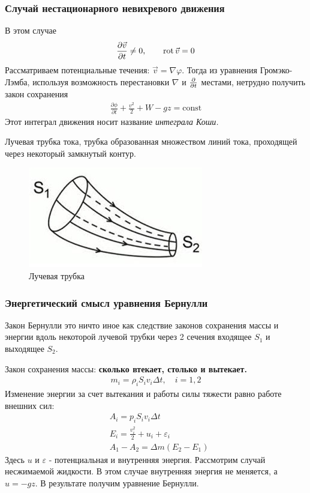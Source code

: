 \subsubsection{Случай нестационарного невихревого движения}
В этом случае
\begin{align*}
	\frac { \partial \vec{v} } { \partial t } \neq 0, \qquad
	\operatorname{rot} \vec{v} = 0
\end{align*}
Рассматриваем  потенциальные течения: $ \vec{v} = \nabla \varphi $. Тогда из уравнения Громэко-Лэмба, используя возможность перестановки $\nabla$ и $\pdv{t}$ местами, нетрудно получить закон сохранения
\begin{align*}
\frac { \partial \phi } { \partial t } + \frac { v ^ { 2 } } { 2 } + W - g z = \mathrm { const }
\end{align*}
Этот интеграл движения носит название \textit{интеграла Коши.}

Лучевая трубка тока, трубка образованная множеством линий тока, проходящей через некоторый замкнутый контур.
\begin{figure}[H]
	\centering
	\includegraphics[scale=1]{photo/trubka.jpg}
	\caption{Лучевая трубка}
	\label{fig:figure7}
\end{figure}

\subsubsection{Энергетический смысл уравнения Бернулли}

Закон Бернулли это ничто иное как следствие законов сохранения  массы и энергии вдоль некоторой лучевой трубки через 2 сечения входящее $S_1$ и выходящее $S_2$.

Закон сохранения массы: \textbf{сколько втекает, столько и вытекает.}
\begin{align*}
m _ { i } = \rho _ { i } S _ { i } v _ { i } \Delta t , \quad i = 1,2
\end{align*}
Изменение энергии за счет вытекания и работы силы тяжести равно работе внешних сил:
\begin{align*}
& A _ { i } = p _ { i } S _ { i } v _ { i } \Delta t \\
& E _ { i } = \frac { v _ { i } ^ { 2 } } { 2 } + u _ { i } + \varepsilon _ { i } \\
& A _ { 1 } - A _ { 2 } = \Delta m \left( E _ { 2 } - E _ { 1 } \right)
\end{align*}
Здесь $u$ и $\varepsilon$ - потенциальная и внутренняя энергия. Рассмотрим случай несжимаемой жидкости. В этом случае внутренняя энергия не меняется, а $ u = - g z $. В результате получим уравнение Бернулли.



